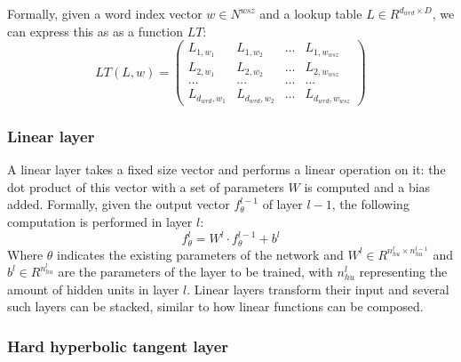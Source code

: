 Formally, given a word index vector $w \in N^{wsz}$ and a lookup table
$L \in R^{d_{wrd} \times D}$, we can express this as as a function
$LT$:
\begin{equation}
  LT(L, w) = \left( \begin{array}{cccc}
L_{1,w_1} & L_{1,w_2} & \ldots & L_{1,w_{wsz}} \\
L_{2,w_1} & L_{2,w_2} & \ldots & L_{2,w_{wsz}} \\
\ldots   & \ldots  & \ldots & \ldots \\
L_{d_{wrd},w_1} & L_{d_{wrd},w_2} & \ldots & L_{d_{wrd},w_{wsz}} \end{array} \right)
\end{equation}
\subsubsection{Linear layer}

A linear layer takes a fixed size vector and performs a linear
operation on it: the dot product of this vector with a set of
parameters $W$ is computed and a bias added. Formally, given the
output vector $f^{l-1}_\theta$ of layer $l-1$, the following
computation is performed in layer $l$:
\begin{equation}
  f^l_\theta = W^l \cdot f^{l-1}_\theta + b^l
\end{equation}
Where $\theta$ indicates the existing parameters of the network and
$W^l \in R^{n^l_{hu} \times n^{l-1}_{hu}} $ and $b^l \in R^{n^l_{hu}} $
are the parameters of the layer to be trained, with $n^l_{hu}$
representing the amount of hidden units in layer $l$. Linear layers
transform their input and several such layers can be stacked, similar
to how linear functions can be composed.

\subsubsection{Hard hyperbolic tangent layer}

